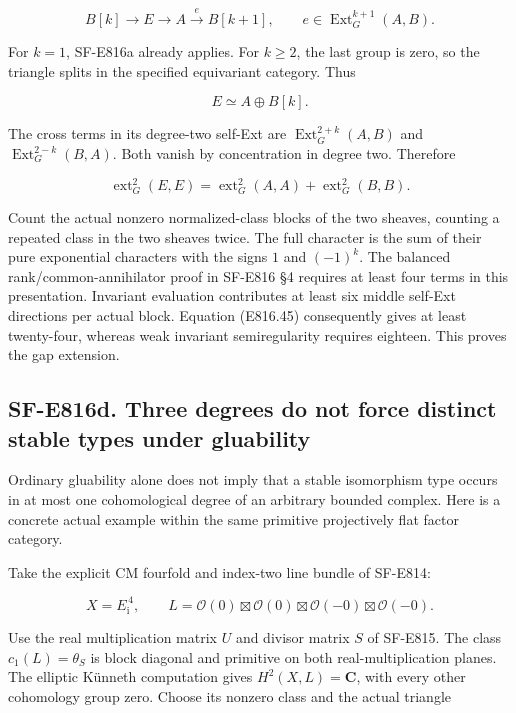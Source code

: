 \[
 B[k]\longrightarrow E\longrightarrow A
      \xrightarrow{e}B[k+1],
 \qquad e\in\operatorname{Ext}^{k+1}_G(A,B).
 \tag{E816.43}
\]

For \(k=1\), SF-E816a already applies. For \(k\ge2\), the last group is
zero, so the triangle splits in the specified equivariant category. Thus

\[
 E\simeq A\oplus B[k].
 \tag{E816.44}
\]

The cross terms in its degree-two self-Ext are
\(\operatorname{Ext}^{2+k}_G(A,B)\) and
\(\operatorname{Ext}^{2-k}_G(B,A)\). Both vanish by concentration in
degree two. Therefore

\[
 \operatorname{ext}^2_G(E,E)
   =\operatorname{ext}^2_G(A,A)+\operatorname{ext}^2_G(B,B).
 \tag{E816.45}
\]

Count the actual nonzero normalized-class blocks of the two sheaves,
counting a repeated class in the two sheaves twice. The full character
is the sum of their pure exponential characters with the signs \(1\) and
\((-1)^k\). The balanced rank/common-annihilator proof in SF-E816 §4
requires at least four terms in this presentation. Invariant evaluation
contributes at least six middle self-Ext directions per actual block.
Equation (E816.45) consequently gives at least twenty-four, whereas weak
invariant semiregularity requires eighteen. This proves the gap
extension.

\subsection{SF-E816d. Three degrees do not force distinct stable types
under
gluability}\label{SF-E816cd-sf-e816d.-three-degrees-do-not-force-distinct-stable-types-under-gluability}

Ordinary gluability alone does not imply that a stable isomorphism type
occurs in at most one cohomological degree of an arbitrary bounded
complex. Here is a concrete actual example within the same primitive
projectively flat factor category.

Take the explicit CM fourfold and index-two line bundle of SF-E814:

\[
 X=E_{\mathrm i}^{\,4},\qquad
 L=\mathcal O(0)\boxtimes\mathcal O(0)
      \boxtimes\mathcal O(-0)\boxtimes\mathcal O(-0).
 \tag{E816.46}
\]

Use the real multiplication matrix \(U\) and divisor matrix \(S\) of
SF-E815. The class \(c_1(L)=\theta_S\) is block diagonal and primitive
on both real-multiplication planes. The elliptic Künneth computation
gives \(H^2(X,L)=\mathbf C\), with every other cohomology group zero.
Choose its nonzero class and the actual triangle

